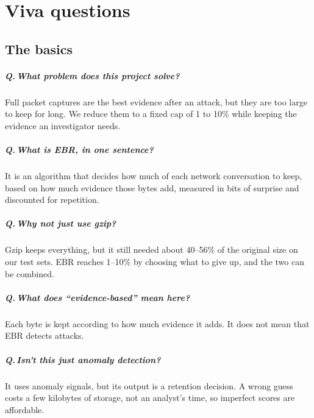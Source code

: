 \chapter{Viva questions}

\newcommand{\qa}[2]{\paragraph{Q.\,#1}\mbox{}\par\vspace{1pt}#2\par}

\section{The basics}
\qa{What problem does this project solve?}{Full packet captures are the best evidence after an attack, but they are too large to keep for long. We reduce them to a fixed cap of 1 to 10\% while keeping the evidence an investigator needs.}
\qa{What is EBR, in one sentence?}{It is an algorithm that decides how much of each network conversation to keep, based on how much evidence those bytes add, measured in bits of surprise and discounted for repetition.}
\qa{Why not just use gzip?}{Gzip keeps everything, but it still needed about 40--56\% of the original size on our test sets. EBR reaches 1--10\% by choosing what to give up, and the two can be combined.}
\qa{What does ``evidence-based'' mean here?}{Each byte is kept according to how much evidence it adds. It does not mean that EBR detects attacks.}
\qa{Isn't this just anomaly detection?}{It uses anomaly signals, but its output is a retention decision. A wrong guess costs a few kilobytes of storage, not an analyst's time, so imperfect scores are affordable.}

